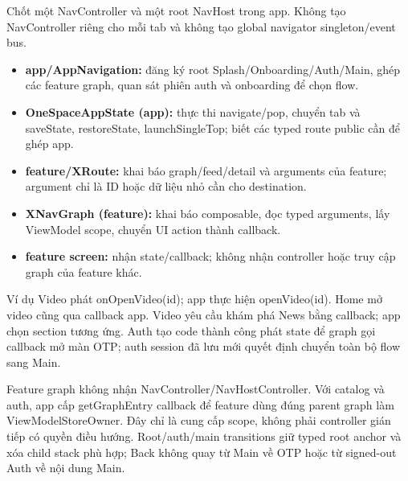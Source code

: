 Chốt một NavController và một root NavHost trong app. Không tạo NavController riêng cho mỗi tab và không tạo global navigator singleton/event bus.

\begin{itemize}
\item \textbf{app/AppNavigation:} đăng ký root Splash/Onboarding/Auth/Main, ghép các feature graph, quan sát phiên auth và onboarding để chọn flow.
\item \textbf{OneSpaceAppState (app):} thực thi navigate/pop, chuyển tab và saveState, restoreState, launchSingleTop; biết các typed route public cần để ghép app.
\item \textbf{feature/XRoute:} khai báo graph/feed/detail và arguments của feature; argument chỉ là ID hoặc dữ liệu nhỏ cần cho destination.
\item \textbf{XNavGraph (feature):} khai báo composable, đọc typed arguments, lấy ViewModel scope, chuyển UI action thành callback.
\item \textbf{feature screen:} nhận state/callback; không nhận controller hoặc truy cập graph của feature khác.
\end{itemize}

Ví dụ Video phát onOpenVideo(id); app thực hiện openVideo(id). Home mở video cũng qua callback app. Video yêu cầu khám phá News bằng callback; app chọn section tương ứng. Auth tạo code thành công phát state để graph gọi callback mở màn OTP; auth session đã lưu mới quyết định chuyển toàn bộ flow sang Main.

Feature graph không nhận NavController/NavHostController. Với catalog và auth, app cấp getGraphEntry callback để feature dùng đúng parent graph làm ViewModelStoreOwner. Đây chỉ là cung cấp scope, không phải controller gián tiếp có quyền điều hướng. Root/auth/main transitions giữ typed root anchor và xóa child stack phù hợp; Back không quay từ Main về OTP hoặc từ signed-out Auth về nội dung Main.

